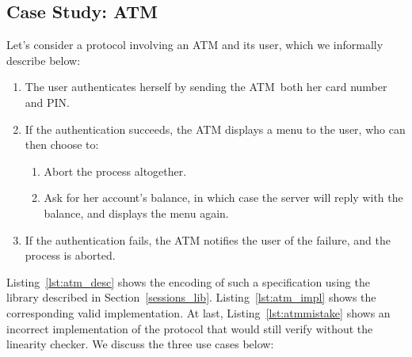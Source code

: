 \documentclass[a4paper,twoside]{article}
\newcommand{\RefSec}[1]{Section~\ref{#1}}
\newcommand{\RefCode}[1]{Listing~\ref{#1}}
\begin{document}
\subsection{Case Study: ATM}

Let's consider a protocol involving an ATM and its user, which we informally describe below:

\begin{enumerate}[label=\Alph*]
\item The user authenticates herself by sending the ATM both her card number and PIN.
\item If the authentication succeeds, the ATM displays a menu to the user, who can then choose to:
\begin{enumerate}
\item Abort the process altogether.
\item Ask for her account's balance, in which case the server will reply with the balance, and displays the menu again.
\end{enumerate}
\item If the authentication fails, the ATM notifies the user of the failure, and the process is aborted.
\end{enumerate}

\RefCode{lst:atm_desc} shows the encoding of such a specification using the library described in \RefSec{sessions_lib}. \RefCode{lst:atm_impl} shows the corresponding valid implementation. At last, \RefCode{lst:atmmistake} shows an incorrect implementation of the protocol that would still verify without the linearity checker. We discuss the three use cases below:
\end{document}
